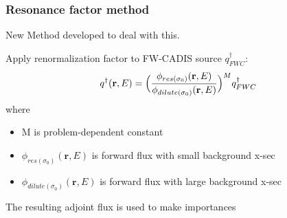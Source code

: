 \documentclass[xcolor=x11names,compress]{beamer}
\renewcommand{\(}{\begin{columns}}
\renewcommand{\)}{\end{columns}}
\newcommand{\<}[1]{\begin{column}{#1}}
\renewcommand{\>}{\end{column}}
\newcommand{\ve}[1]{\ensuremath{\mathbf{#1}}}
\newcommand{\micro}{\ensuremath{\sigma}}
\begin{document}
\begin{frame}[fragile]
  \frametitle{Resonance factor method \cite{Wilson2015}}
  
  \alert{New Method} developed to deal with this. 
  \vspace{0.5 em}
  
  	Apply renormalization factor to FW-CADIS source $q^{\dagger}_{FWC}$: 
	\begin{equation}
   	q^{\dagger}(\ve{r},E) = \Bigl(\frac{\phi_{res(\micro_0)}(\ve{r},E)}{\phi_{dilute(\micro_0)}(\ve{r},E)}\Bigr)^M q^{\dagger}_{FWC}  \nonumber
  	 \label{eq:newQ}
	\end{equation}
	where
	\begin{itemize}
  	\item M is problem-dependent constant 
 	 \item $\phi_{res(\micro_0)}(\ve{r},E)$ is forward flux with small background x-sec
 	 \item $\phi_{dilute(\micro_0)}(\ve{r},E)$ is forward flux with large background x-sec
	\end{itemize}
	\pause
	\vspace*{1 em}
	The resulting adjoint flux is used to make importances
	
	
\end{frame}


%  
%	
%  
\end{document}
